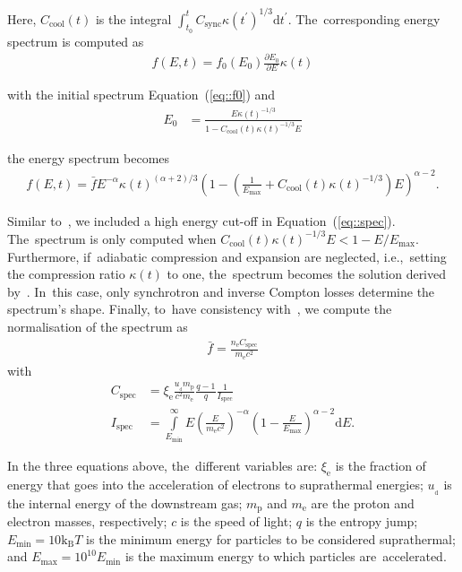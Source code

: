 \documentclass[galaxies,article,accept,moreauthors,pdftex]{mdpi}
\newcommand{\dd}{\mathrm{d}}
\newcommand{\Csync}{C_{\mathrm{sync}}}
\newcommand{\Cspec}{C_{\mathrm{spec}}}
\newcommand{\Ccool}{C_{\mathrm{cool}}}
\newcommand{\me}{m_\mathrm{e}}
\newcommand{\mpr}{m_\mathrm{p}}
\begin{document}
Here, $\Ccool(t)$ is the integral $\int_{t_0}^t \Csync \kappa(t^{\prime})^{1/3} \dd t^{\prime}$. The~corresponding energy spectrum is computed as
\begin{align}
 f(E,t) = f_0(E_0) \frac{\partial E_0}{\partial E} \kappa(t)
\end{align}

with the initial spectrum Equation~(\ref{eq::f0}) and
\begin{align}
 E_0 &= \frac{E \kappa(t)^{-1/3}}{1- \Ccool(t) \kappa(t)^{-1/3} E}
\end{align}

the energy spectrum becomes
\begin{align}
 f(E,t) = \bar{f} E^{-\alpha} \kappa(t)^{(\alpha+2)/3} \left(1 - \left(\frac{1}{E_{\max}} + \Ccool(t)\kappa(t)^{-1/3}\right) E \right)^{\alpha-2}. \label{eq::spec}
\end{align} 


Similar to~\cite{2007MNRAS.375...77H}, we included a high energy cut-off in Equation~(\ref{eq::spec}). The~spectrum is only computed when $\Ccool(t)\kappa(t)^{-1/3}E < 1 - E/E_{\max}$. 
Furthermore, if~adiabatic compression and expansion are neglected, i.e.,~setting the compression ratio $\kappa(t)$ to one, the~spectrum becomes the solution derived by~\cite{2007MNRAS.375...77H}. In~this case, only synchrotron and inverse Compton losses determine the spectrum's shape.
Finally, to~have consistency with~\cite{2007MNRAS.375...77H}, we compute the normalisation of the spectrum as
\begin{align}
 \bar{f} = \frac{n_{\mathrm{e}} \Cspec}{\me c^2} \label{eq::fbar}
\end{align}
with
\begin{align}
 \Cspec &= \xi_{\mathrm{e}} \frac{u_{_\mathrm{d}} \mpr}{c^2 \me}\frac{q-1}{q} \frac{1}{I_{\mathrm{spec}}} \\
 I_{\mathrm{spec}} &= \int\limits_{E_{\min}}^{\infty} E \left(\frac{E}{\me c^2}\right)^{-\alpha} \left(1-\frac{E}{E_{\max}} \right)^{\alpha-2} \dd E .
\end{align}

In the three equations above, the~different variables are: 
$\xi_{\mathrm{e}}$ is the fraction of energy that goes into the acceleration of electrons to suprathermal energies;
$u_{_\mathrm{d}}$ is the internal energy of the downstream gas;
$\mpr$ and $\me$ are the proton and electron masses, respectively;
$c$ is the speed of light;
$q$ is the entropy jump;
$E_{\min} = 10 \mathrm{k_B} T$ is the minimum energy for particles to be considered suprathermal; and $E_{\max} = 10^{10} E_{\min}$ is the maximum energy to which particles are~accelerated.
\end{document}
